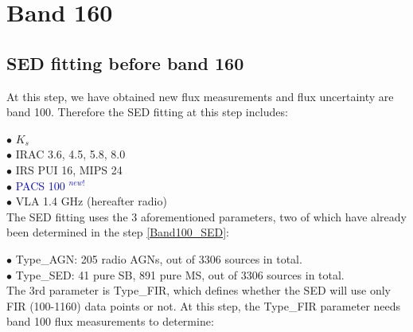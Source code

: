 \documentclass[11pt,a4paper]{article}
\begin{document}

\clearpage

\section{Band 160}

\subsection{SED fitting before band 160}
\label{Band160_Galsed}

At this step, we have obtained new flux measurements and flux uncertainty are band 100. Therefore the SED fitting at this step includes:

\indent\hspace{15pt}$\bullet$ $K_s$
\\
\indent\hspace{15pt}$\bullet$ IRAC 3.6, 4.5, 5.8, 8.0
\\
\indent\hspace{15pt}$\bullet$ IRS PUI 16, MIPS 24
\\
\indent\hspace{15pt}$\bullet$ \textcolor{blue}{PACS 100 $^{new!}$}
\\
\indent\hspace{15pt}$\bullet$ VLA 1.4 GHz (hereafter radio) 
\\

The SED fitting uses the 3 aforementioned parameters, two of which have already been determined in the step \ref{Band100_SED}:

\indent\hspace{15pt}$\bullet$ 
Type\_AGN: 205 radio AGNs, out of 3306 sources in total. 
\\
\indent\hspace{15pt}$\bullet$ 
Type\_SED: 41 pure SB, 891 pure MS, out of 3306 sources in total. 
\\

The 3rd parameter is Type\_FIR, which defines whether the SED will use only FIR (100-1160) data points or not. At this step, the Type\_FIR parameter needs band 100 flux measurements to determine: 
\end{document}
